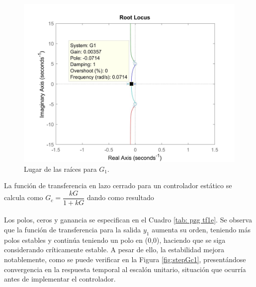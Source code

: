 \documentclass[journal]{IEEEtran}
\begin{document}
\begin{figure}[h!]
\caption{Lugar de las raíces para $G_1$.\label{fig:rlocusG1}}
  \centering
\includegraphics[scale=0.18]{control/k_G1.jpg}
\end{figure}

La función de transferencia en lazo cerrado para un controlador estático se calcula como $G_c = \dfrac{kG}{1+kG}$ dando como resultado
\\

\\

Los polos, ceros y ganancia se especifican en el Cuadro \ref{tab: pzg tf1e}. Se observa que la función de transferencia para la salida $y_1$ aumenta su orden, teniendo más polos estables y continúa teniendo un polo en (0,0), haciendo que se siga considerando críticamente estable. A pesar de ello, la estabilidad mejora notablemente, como se puede verificar en la Figura \ref{fig:stepGc1}, presentándose convergencia en la respuesta temporal al escalón unitario, situación que ocurría antes de implementar el controlador.  
\end{document}
